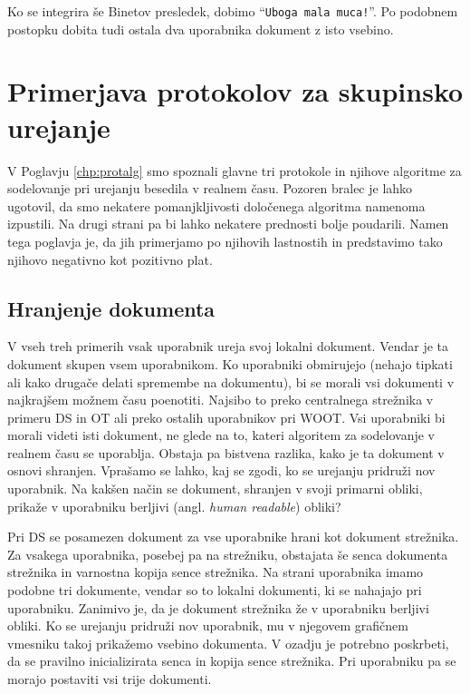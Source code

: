 \documentclass[a4paper, 12pt, twoside]{book}
\begin{document}
Ko se integrira še Binetov presledek, dobimo “{\tt Uboga mala muca!}”. Po podobnem postopku dobita tudi ostala dva uporabnika dokument z isto vsebino.

\chapter{Primerjava protokolov za skupinsko urejanje}

V Poglavju \ref{chp:protalg} smo spoznali glavne tri protokole in njihove algoritme za sodelovanje pri urejanju besedila v realnem času. Pozoren bralec je lahko ugotovil, da smo nekatere pomanjkljivosti določenega algoritma namenoma izpustili. Na drugi strani pa bi lahko nekatere prednosti bolje poudarili. Namen tega poglavja je, da jih primerjamo po njihovih lastnostih in predstavimo tako njihovo negativno kot pozitivno plat.

\section{Hranjenje dokumenta}

V vseh treh primerih vsak uporabnik ureja svoj lokalni dokument. Vendar je ta dokument skupen vsem uporabnikom. Ko uporabniki obmirujejo (nehajo tipkati ali kako drugače delati spremembe na dokumentu), bi se morali vsi dokumenti v najkrajšem možnem času poenotiti. Najsibo to preko centralnega strežnika v primeru DS in OT ali preko ostalih uporabnikov pri WOOT. Vsi uporabniki bi morali videti isti dokument, ne glede na to, kateri algoritem za sodelovanje v realnem času se uporablja. Obstaja pa bistvena razlika, kako je ta dokument v osnovi shranjen. Vprašamo se lahko, kaj se zgodi, ko se urejanju pridruži nov uporabnik. Na kakšen način se dokument, shranjen v svoji primarni obliki, prikaže v uporabniku berljivi (angl. \textit{human readable}) obliki?

Pri DS se posamezen dokument za vse uporabnike hrani kot dokument strežnika. Za vsakega uporabnika, posebej pa na strežniku, obstajata še senca dokumenta strežnika in varnostna kopija sence strežnika. Na strani uporabnika imamo podobne tri dokumente, vendar so to lokalni dokumenti, ki se nahajajo pri uporabniku. Zanimivo je, da je dokument strežnika že v uporabniku berljivi obliki. Ko se urejanju pridruži nov uporabnik, mu v njegovem grafičnem vmesniku takoj prikažemo vsebino dokumenta. V ozadju je potrebno poskrbeti, da se pravilno inicializirata senca in kopija sence strežnika. Pri uporabniku pa se morajo postaviti vsi trije dokumenti.
\end{document}
